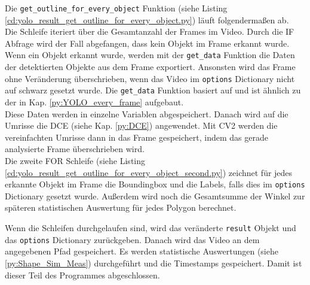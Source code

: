 {	Die \lstinline|get_outline_for_every_object| Funktion (siehe Listing \ref{cd:yolo_result_get_outline_for_every_object.py}) läuft folgendermaßen ab. \\
	Die Schleife iteriert über die Gesamtanzahl der Frames im Video. Durch die IF Abfrage wird der Fall abgefangen, dass kein Objekt im Frame erkannt wurde. Wenn ein Objekt erkannt wurde, werden mit der \lstinline|get_data| Funktion die Daten der detektierten Objekte aus dem Frame exportiert. Ansonsten wird das Frame ohne Veränderung überschrieben, wenn das Video im \lstinline|options| Dictionary nicht auf schwarz gesetzt wurde. Die \lstinline|get_data| Funktion basiert auf \citeauthor{Canu_pysource} \citep{Canu_pysource} und ist ähnlich zu der in Kap. \ref{py:YOLO_every_frame} aufgebaut. \\
	Diese Daten werden in einzelne Variablen abgespeichert. Danach wird auf die Umrisse die DCE (siehe Kap. \ref{py:DCE}) angewendet. Mit CV2 werden die vereinfachten Umrisse dann in das Frame gespeichert, indem das gerade analysierte Frame überschrieben wird. \\
	
	Die zweite FOR Schleife (siehe Listing \ref{cd:yolo_result_get_outline_for_every_object_second.py}) zeichnet für jedes erkannte Objekt im Frame die Boundingbox und die Labels, falls dies im \lstinline|options| Dictionary gesetzt wurde. Außerdem wird noch die Gesamtsumme der Winkel  zur späteren statistischen Auswertung für jedes Polygon berechnet.
	
	Wenn die Schleifen durchgelaufen sind, wird das veränderte \lstinline|result| Objekt und das \lstinline|options| Dictionary zurückgeben. Danach wird das Video an dem angegebenen Pfad gespeichert. Es werden statistische Auswertungen (siehe \ref{py:Shape_Sim_Meas}) durchgeführt und die Timestamps gespeichert. Damit ist dieser Teil des  Programmes abgeschlossen. \\
	}

